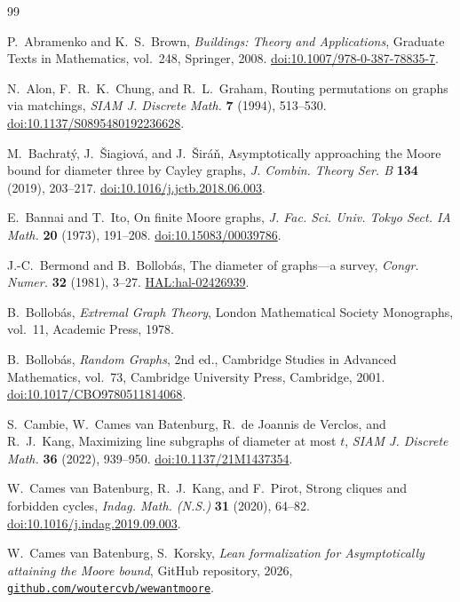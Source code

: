 \documentclass[11pt]{article}
\theoremstyle{plain}
\theoremstyle{definition}
\begin{document}
\begin{thebibliography}{99}
\raggedright

P.~Abramenko and K.~S.~Brown,
\emph{Buildings: Theory and Applications},
Graduate Texts in Mathematics, vol.~248, Springer, 2008.
\href{https://doi.org/10.1007/978-0-387-78835-7}
{doi:10.1007/978-0-387-78835-7}.

N.~Alon, F.~R.~K.~Chung, and R.~L.~Graham,
Routing permutations on graphs via matchings,
\emph{SIAM J. Discrete Math.} \textbf{7} (1994), 513--530.
\href{https://doi.org/10.1137/S0895480192236628}
{doi:10.1137/S0895480192236628}.

M.~Bachrat\'y, J.~\v{S}iagiov\'a, and J.~\v{S}ir\'a\v{n},
Asymptotically approaching the Moore bound for diameter three by Cayley graphs,
\emph{J. Combin. Theory Ser. B} \textbf{134} (2019), 203--217.
\href{https://doi.org/10.1016/j.jctb.2018.06.003}
{doi:10.1016/j.jctb.2018.06.003}.

E.~Bannai and T.~Ito,
On finite Moore graphs,
\emph{J. Fac. Sci. Univ. Tokyo Sect. IA Math.} \textbf{20} (1973), 191--208.
\href{https://doi.org/10.15083/00039786}{doi:10.15083/00039786}.

J.-C.~Bermond and B.~Bollob\'as,
The diameter of graphs---a survey,
\emph{Congr. Numer.} \textbf{32} (1981), 3--27.
\href{https://inria.hal.science/hal-02426939}
{HAL:hal-02426939}.


B.~Bollob\'as,
\emph{Extremal Graph Theory},
London Mathematical Society Monographs, vol.~11, Academic Press, 1978.

B.~Bollob\'as,
\emph{Random Graphs},
2nd ed., Cambridge Studies in Advanced Mathematics, vol.~73,
Cambridge University Press, Cambridge, 2001.
\href{https://doi.org/10.1017/CBO9780511814068}
{doi:10.1017/CBO9780511814068}.

S.~Cambie, W.~Cames van Batenburg, R.~de Joannis de Verclos, and R.~J.~Kang,
Maximizing line subgraphs of diameter at most $t$,
\emph{SIAM J. Discrete Math.} \textbf{36} (2022), 939--950.
\href{https://doi.org/10.1137/21M1437354}
{doi:10.1137/21M1437354}.

W.~Cames van Batenburg, R.~J.~Kang, and F.~Pirot,
Strong cliques and forbidden cycles,
\emph{Indag. Math. (N.S.)} \textbf{31} (2020), 64--82.
\href{https://doi.org/10.1016/j.indag.2019.09.003}
{doi:10.1016/j.indag.2019.09.003}.

W.~Cames van Batenburg, S.~Korsky,
\emph{Lean formalization for 
Asymptotically attaining the Moore bound},
GitHub repository, 2026,
\href{https://github.com/woutercvb/wewantmoore}
{\texttt{github.com/woutercvb/wewantmoore}}.


\end{thebibliography}
\end{document}
